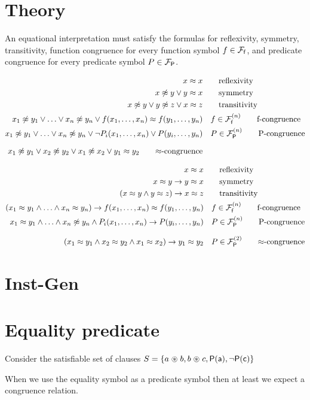 \section{Theory}



	An equational interpretation must satisfy the formulas for reflexivity, symmetry, transitivity, 
	function congruence for every function symbol $f\in{{\mathcal F}_{\mathsf f}}$, 
	and predicate congruence for every predicate symbol $P\in{{\mathcal F}_{\mathsf P}}$.

%

\begin{align*}
	 x \mEQ x & \tag*{reflexivity} \\
	x \mNE y \lor y \mEQ x & \tag*{symmetry}\\
	x\mNE y\lor y\mNE z\lor x\mEQ z & \tag*{transitivity} \\
	x_1 \mNE y_1\lor\ldots\lor x_n \mNE y_n\lor f(x_1,\ldots,x_n)\mEQ f(y_1,\ldots,y_n) &\quad f\in\mcFfn
	\tag*{f-congruence}
	\\
	x_1\mNE y_1\lor\ldots\lor x_n\mNE y_n\lor\lnot P_i(x_1,\ldots,x_n)\lor P(y_i,\ldots,y_n) &\quad P\in\mcFPn
	\tag*{P-congruence}
	\\[0.7em]
	x_1\mNE y_1\lor x_2\mNE y_2
	\lor x_1\mNE x_2
	\lor y_1\mEQ y_2
	\tag*{$\mEQ$-congruence}
\end{align*}

\begin{align*}
	x \mEQ x & \tag*{reflexivity} 
	\\
	x \mEQ y \limp y \mEQ x & \tag*{symmetry}
	\\
	(x\mEQ y\land y\mEQ z)\limp x\mEQ z & \tag*{transitivity} 
	\\
	(x_1 \mEQ y_1\land\ldots\land x_n \mEQ y_n)\limp f(x_1,\ldots,x_n)\mEQ f(y_1,\ldots,y_n) &\quad f\in\mcFfn
	\tag*{f-congruence}
	\\
	x_1\mEQ y_1\land\ldots\land x_n\mNE y_n\land P_i(x_1,\ldots,x_n)
	\limp P(y_i,\ldots,y_n) &\quad P\in\mcFPn
	\tag*{P-congruence}
	\\[0.7em]
	(x_1\mEQ y_1
	\land x_2\mEQ y_2
	\land x_1\mEQ x_2)
	\limp y_1\mEQ y_2
	& \quad P\in\mcFPn[2]
		\tag*{$\mEQ$-congruence}
\end{align*}
	
	



\section{Inst-Gen}

\section{Equality predicate}

Consider the satisfiable set of clauses $S = \{a \mathrel{\circledast} b, b \mathrel{\circledast} c, {\mathsf P}({\mathsf a}), \lnot {\mathsf P}({\mathsf c}) \}$

When we use the equality symbol as a predicate symbol 
then at least we expect a congruence relation.




